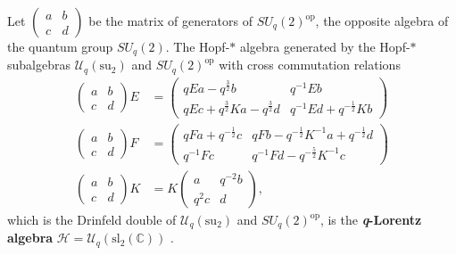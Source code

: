 \documentclass[12pt,a4paper]{article}
\newcommand{\op}{\mathrm{op}}
\newcommand{\Hcal}{\mathcal{H}}
\newcommand{\suq}{{\mathcal{U}_q(\mathrm{su}_2)}}
\newcommand{\slC}{{\mathcal{U}_q(\mathrm{sl}_2(\mathbb{C})) }}
\newcommand{\SUq}{{SU_q(2)}}
\begin{document}
Let $(\begin{smallmatrix}a&b\\c&d\end{smallmatrix})$ be the matrix of
generators of $\SUq^\op$, the opposite algebra of the quantum group
$\SUq$.  The Hopf-$*$ algebra generated by the Hopf-$*$ subalgebras
$\suq$ and $\SUq^\op$ with cross commutation relations
\begin{equation*}
\begin{aligned}
  \begin{pmatrix} a & b \\ c & d \end{pmatrix} E
  &= \begin{pmatrix} q E a - q^{\frac{3}{2}} b & q^{-1}Eb \\
    qEc+q^{\frac{3}{2}}Ka- q^{\frac{3}{2}}d &
    q^{-1}Ed+q^{-\frac{1}{2}}Kb \end{pmatrix} \\
  \begin{pmatrix} a & b \\ c & d \end{pmatrix} F
  &= \begin{pmatrix} q F a + q^{-\frac{1}{2}}c &
    qFb-q^{-\frac{1}{2}}K^{-1}a + q^{-\frac{1}{2}}d \\
    q^{-1}Fc & q^{-1}Fd-q^{-\frac{5}{2}}K^{-1}c \end{pmatrix} \\
  \begin{pmatrix} a & b \\ c & d \end{pmatrix} K
  &= K \begin{pmatrix} a & q^{-2}b \\ q^{2} c & d\end{pmatrix},
\end{aligned}
\end{equation*}
which is the Drinfeld double of $\suq$ and $\SUq^\op$, is the
\textbf{\textit{q}-Lorentz algebra} $\Hcal = \slC$ \cite{Podles:1990}.
\end{document}
